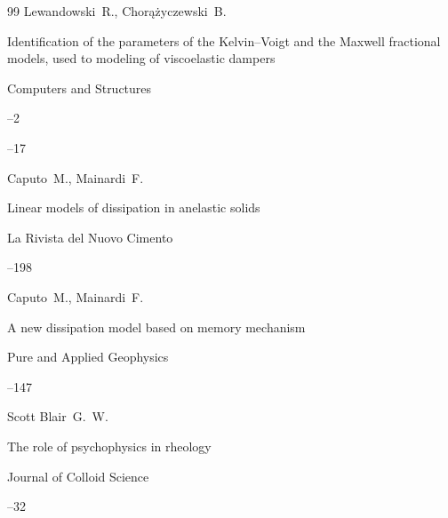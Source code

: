 \begin{thebibliography}{99}
\by Lewandowski~R., \Russian Chor\k{a}\.zyczewski~B.

\paper  Identification of the parameters of the Kelvin--Voigt and the Maxwell fractional models, used to modeling of viscoelastic dampers 

\jour Computers and Structures


--2


--17







\by Caputo~M., Mainardi~F.

\paper Linear models of dissipation in anelastic solids

\jour  La Rivista del Nuovo Cimento




--198





\by Caputo~M., Mainardi~F.

\paper A new dissipation model based on memory mechanism

\jour   Pure and Applied Geophysics




--147





\by Scott Blair~G.~W.

\paper The role of psychophysics in rheology

\jour  Journal of Colloid Science




--32





\end{thebibliography}
